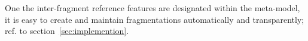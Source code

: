 One the inter-fragment reference features are designated within the meta-model, it is easy to create and maintain fragmentations automatically and transparently; ref. to section~\ref{sec:implemention}.

%
%
%
%
%
